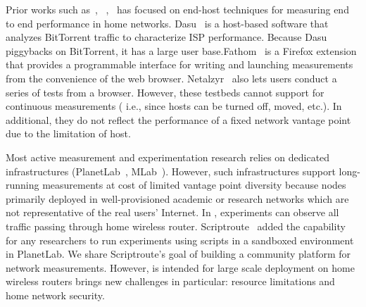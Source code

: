 Prior works such as~\cite{sanchez2014measurement},~\cite{dhawan2012fathom}
,~\cite{kreibich2010netalyzr} has focused on end-host techniques for 
measuring end to end performance in home networks. Dasu~\cite{
sanchez2014measurement} is a host-based software that analyzes BitTorrent 
traffic to characterize ISP performance. Because Dasu piggybacks on 
BitTorrent, it has a large user base.Fathom~\cite{dhawan2012fathom} is a 
Firefox extension that provides a programmable interface for writing and 
launching measurements from the convenience of the web browser. Netalzyr~\cite{kreibich2010netalyzr} also lets users conduct a series of tests from a 
browser. However, these testbeds cannot support for continuous measurements (
i.e., since hosts can be turned off, moved, etc.). In additional, they do 
not reflect the performance of a fixed network vantage point due to the 
limitation of host.

Most active measurement and experimentation research relies on dedicated infrastructures (PlanetLab~\cite{chun2003planetlab}, MLab~\cite{mlab}). However, such infrastructures support long-running measurements at cost of limited vantage point diversity because nodes primarily deployed in well-provisioned academic or research networks which are not representative of the real users' Internet. In \sysname, experiments can observe all traffic passing through home wireless router. Scriptroute~\cite{spring2003scriptroute} added the capability for any researchers to run experiments using scripts in a sandboxed environment in PlanetLab. We share Scriptroute's goal of building a community platform for network measurements. However, \sysname is intended for large scale deployment on home wireless routers brings new challenges in particular: resource limitations and home network security.


